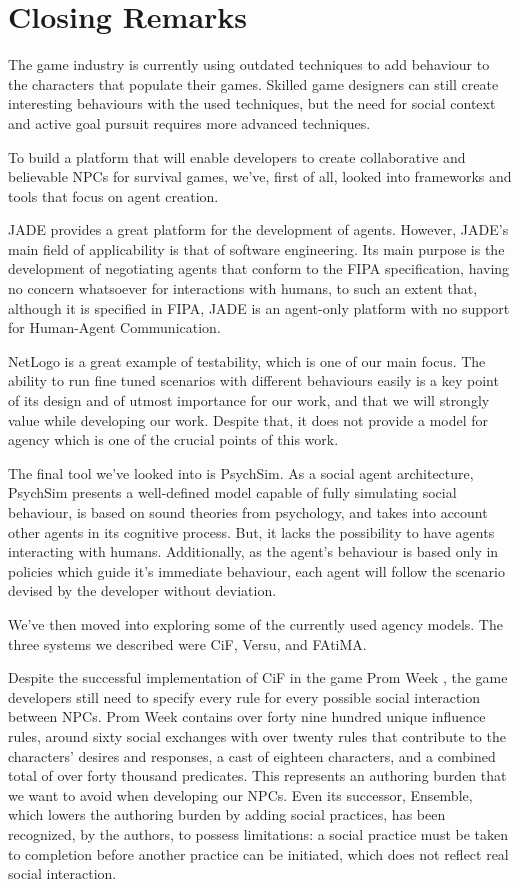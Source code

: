 \section{Closing Remarks}

\noindent The game industry is currently using outdated techniques to add behaviour to the characters that populate their games.
Skilled game designers can still create interesting behaviours with the used techniques, but the need for social context and active goal pursuit requires more advanced techniques.

To build a platform that will enable developers to create collaborative and believable \acp{NPC} for survival games, we've, first of all, looked into frameworks and tools that focus on agent creation.

\ac{JADE} provides a great platform for the development of agents.
However, \ac{JADE}'s main field of applicability is that of software engineering.
Its main purpose is the development of negotiating agents that conform to the \ac{FIPA} specification, having no concern whatsoever for interactions with humans, to such an extent that, although it is specified in \ac{FIPA}, \ac{JADE} is an agent-only platform with no support for Human-Agent Communication. 

NetLogo is a great example of testability, which is one of our main focus.
The ability to run fine tuned scenarios with different behaviours easily is a key point of its design and of utmost importance for our work, and that we will strongly value while developing our work.
Despite that, it does not provide a model for agency which is one of the crucial points of this work.

The final tool we've looked into is PsychSim.
As a social agent architecture, PsychSim presents a well-defined model capable of fully simulating social behaviour, is based on sound theories from psychology, and takes into account other agents in its cognitive process.
But, it lacks the possibility to have agents interacting with humans.
Additionally, as the agent's behaviour is based only in policies which guide it's immediate behaviour, each agent will follow the scenario devised by the developer without deviation.

We've then moved into exploring some of the currently used agency models.
The three systems we described were \ac{CiF}, Versu, and \ac{FAtiMA}.

Despite the successful implementation of \ac{CiF} in the game Prom Week \cite{mccoy:prom-week}, the game developers still need to specify every rule for every possible social interaction between \acp{NPC}.
Prom Week contains over forty nine hundred unique influence rules, around sixty social exchanges with over twenty rules that contribute to the characters' desires and responses, a cast of eighteen characters, and a combined total of over forty thousand predicates.
This represents an authoring burden that we want to avoid when developing our \acp{NPC}.
Even its successor, Ensemble, which lowers the authoring burden by adding social practices, has been recognized, by the authors, to possess limitations: a social practice must be taken to completion before another practice can be initiated, which does not reflect real social interaction.

